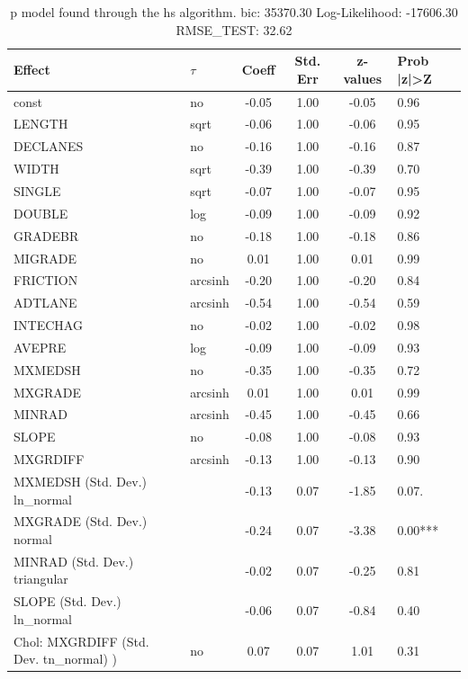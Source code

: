 \begin{table}
	\caption{p model found through the hs algorithm. bic: 35370.30 Log-Likelihood: -17606.30 RMSE_TEST: 32.62}
	\begin{center}
		\begin{tabular}{|l|l|c|c|c|l|}
			\hline
			Effect & $\tau$ & Coeff & Std. Err & z-values & Prob |z|>Z \\
			\hline
			const & no & -0.05 & 1.00 & -0.05 & 0.96 \\
			\hline
			LENGTH & sqrt & -0.06 & 1.00 & -0.06 & 0.95 \\
			\hline
			DECLANES & no & -0.16 & 1.00 & -0.16 & 0.87 \\
			\hline
			WIDTH & sqrt & -0.39 & 1.00 & -0.39 & 0.70 \\
			\hline
			SINGLE & sqrt & -0.07 & 1.00 & -0.07 & 0.95 \\
			\hline
			DOUBLE & log & -0.09 & 1.00 & -0.09 & 0.92 \\
			\hline
			GRADEBR & no & -0.18 & 1.00 & -0.18 & 0.86 \\
			\hline
			MIGRADE & no & 0.01 & 1.00 & 0.01 & 0.99 \\
			\hline
			FRICTION & arcsinh & -0.20 & 1.00 & -0.20 & 0.84 \\
			\hline
			ADTLANE & arcsinh & -0.54 & 1.00 & -0.54 & 0.59 \\
			\hline
			INTECHAG & no & -0.02 & 1.00 & -0.02 & 0.98 \\
			\hline
			AVEPRE & log & -0.09 & 1.00 & -0.09 & 0.93 \\
			\hline
			MXMEDSH & no & -0.35 & 1.00 & -0.35 & 0.72 \\
			\hline
			MXGRADE & arcsinh & 0.01 & 1.00 & 0.01 & 0.99 \\
			\hline
			MINRAD & arcsinh & -0.45 & 1.00 & -0.45 & 0.66 \\
			\hline
			SLOPE & no & -0.08 & 1.00 & -0.08 & 0.93 \\
			\hline
			MXGRDIFF & arcsinh & -0.13 & 1.00 & -0.13 & 0.90 \\
			\hline
			MXMEDSH (Std. Dev.) ln_normal &  & -0.13 & 0.07 & -1.85 & 0.07. \\
			\hline
			MXGRADE (Std. Dev.) normal &  & -0.24 & 0.07 & -3.38 & 0.00*** \\
			\hline
			MINRAD (Std. Dev.) triangular &  & -0.02 & 0.07 & -0.25 & 0.81 \\
			\hline
			SLOPE (Std. Dev.) ln_normal &  & -0.06 & 0.07 & -0.84 & 0.40 \\
			\hline
			 Chol: MXGRDIFF (Std. Dev. tn_normal) ) & no & 0.07 & 0.07 & 1.01 & 0.31 \\

\end{tabular}
\end{center}
\end{table}
